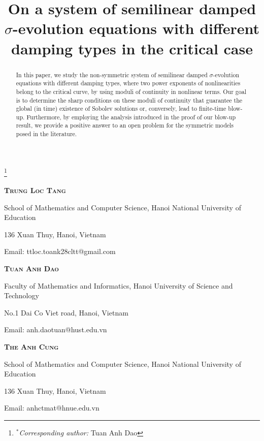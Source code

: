 \documentclass[11pt,reqno]{amsart}
\numberwithin{equation}{section}
\begin{document}
 
\title[A system of semilinear damped $\sigma$-evolution equations]{On a system of semilinear damped $\sigma$-evolution equations with different damping types in the critical case}

\thanks{$^* $\textit{Corresponding author:} Tuan Anh Dao}

\maketitle
\centerline{\scshape \textbf{Trung Loc Tang}}
{\footnotesize
	\centerline{School of Mathematics and Computer Science, Hanoi National University of Education}
	\centerline{136 Xuan Thuy, Hanoi, Vietnam}
	\centerline{Email: ttloc.toank28cltt@gmail.com}}
\medskip

\centerline{\scshape \textbf{Tuan Anh Dao}}
{\footnotesize
	\centerline{Faculty of Mathematics and Informatics, Hanoi University of Science and Technology}
	\centerline{No.1 Dai Co Viet road, Hanoi, Vietnam}
	\centerline{Email: anh.daotuan@hust.edu.vn}}
\medskip

\centerline{\scshape \textbf{The Anh Cung}}
{\footnotesize
	\centerline{School of Mathematics and Computer Science, Hanoi National University of Education}
	\centerline{136 Xuan Thuy, Hanoi, Vietnam}
	\centerline{Email: anhctmat@hnue.edu.vn}}


\begin{abstract}
In this paper, we study the non-symmetric system of semilinear damped $\sigma$-evolution equations with different damping types, where two power exponents of nonlinearities belong to the critical curve, by using moduli of continuity in nonlinear terms. Our goal is to determine the sharp conditions on these moduli of continuity that guarantee the global (in time) existence of Sobolev solutions or, conversely, lead to finite-time blow-up. Furthermore, by employing the analysis introduced in the proof of our blow-up result, we provide a positive answer to an open problem for the symmetric models posed in the literature.
\end{abstract}

\tableofcontents
\end{document}
